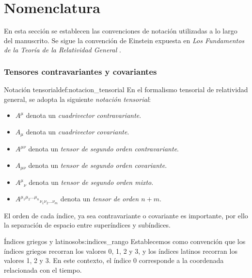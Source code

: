 \section{Nomenclatura}

    En esta sección se establecen las convenciones de notación utilizadas a lo largo del manuscrito. Se sigue la convención de Einstein expuesta en \textit{Los Fundamentos de la Teoría de la Relatividad General} \cite{einstein1916fundamentos}.

    \subsubsection{Tensores contravariantes y covariantes}

        \begin{definicion}{Notación tensorial}{def:notacion_tensorial}
            En el formalismo tensorial de relatividad general, se adopta la siguiente \textit{notación tensorial}:
            \begin{itemize}
                \item $A^\mu$ denota un \textit{cuadrivector contravariante}.
                \item $A_\mu$ denota un \textit{cuadrivector covariante}.
                \item $A^{\mu\nu}$ denota un \textit{tensor de segundo orden contravariante}.
                \item $A_{\mu\nu}$ denota un \textit{tensor de segundo orden covariante}.
                \item ${A^{\mu}}_{\nu}$ denota un \textit{tensor de segundo orden mixto}.
                \item ${A^{\mu_1\mu_2...\mu_n}}_{\nu_1\nu_2...\nu_m}$ denota un \textit{tensor de orden $n+m$}.
            \end{itemize}
        \end{definicion}

        El orden de cada índice, ya sea contravariante o covariante es importante, por ello la separación de espacio entre superíndices y subíndices.

        \begin{observacion}{Índices griegos y latinos}{obs:indices_rango}
            Establecemos como convención que los índices griegos recorran los valores 0, 1, 2 y 3, y los índices latinos recorran los valores 1, 2 y 3. En este contexto, el índice 0 corresponde a la coordenada relacionada con el tiempo.
        \end{observacion}

